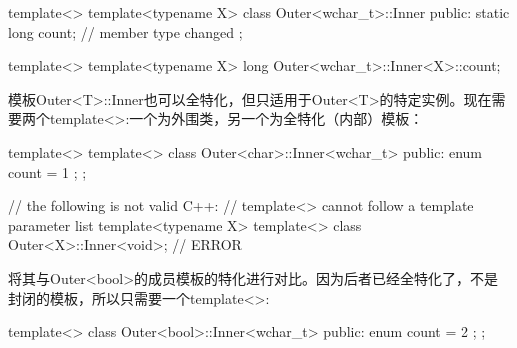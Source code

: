 \begin{cpp}
template<>
template<typename X>
class Outer<wchar_t>::Inner {
	public:
	static long count; // member type changed
};

template<>
	template<typename X>
	long Outer<wchar_t>::Inner<X>::count;
\end{cpp}

模板Outer<T>::Inner也可以全特化，但只适用于Outer<T>的特定实例。现在需要两个template<>:一个为外围类，另一个为全特化（内部）模板：

\begin{cpp}
template<>
	template<>
	class Outer<char>::Inner<wchar_t> {
		public:
		enum { count = 1 };
	};

// the following is not valid C++:
// template<> cannot follow a template parameter list
template<typename X>
template<> class Outer<X>::Inner<void>; // ERROR
\end{cpp}

将其与Outer<bool>的成员模板的特化进行对比。因为后者已经全特化了，不是封闭的模板，所以只需要一个template<>:

\begin{cpp}
template<>
class Outer<bool>::Inner<wchar_t> {
	public:
	enum { count = 2 };
};
\end{cpp}

































